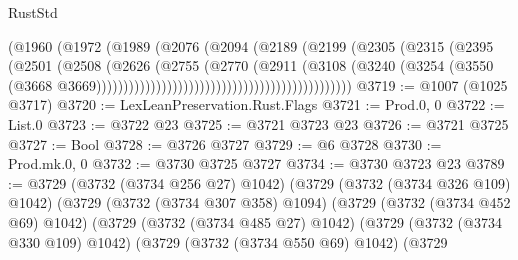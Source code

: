 \begin{lexlean}{RustStd}
\begin{coremodule}
                                                        (@1960
                                                          (@1972
                                                            (@1989
                                                              (@2076
                                                                (@2094
                                                                  (@2189
                                                                    (@2199
                                                                      (@2305
                                                                        (@2315
                                                                          (@2395
                                                                            (@2501
                                                                              (@2508
                                                                                (@2626
                                                                                  (@2755
                                                                                    (@2770
                                                                                      (@2911
                                                                                        (@3108
                                                                                          (@3240
                                                                                            (@3254
                                                                                              (@3550
                                                                                                (@3668
                                                                                                  @3669)))))))))))))))))))))))))))))))))))))))))))))))
@3719 := @1007 (@1025 @3717)
@3720 := LexLeanPreservation.Rust.Flags
@3721 := Prod.{0, 0}
@3722 := List.{0}
@3723 := @3722 @23
@3725 := @3721 @3723 @23
@3726 := @3721 @3725
@3727 := Bool
@3728 := @3726 @3727
@3729 := @6 @3728
@3730 := Prod.mk.{0, 0}
@3732 := @3730 @3725 @3727
@3734 := @3730 @3723 @23
@3789 := @3729
    (@3732 (@3734 @256 @27) @1042)
    (@3729
      (@3732 (@3734 @326 @109) @1042)
      (@3729
        (@3732 (@3734 @307 @358) @1094)
        (@3729
          (@3732 (@3734 @452 @69) @1042)
          (@3729
            (@3732 (@3734 @485 @27) @1042)
            (@3729
              (@3732 (@3734 @330 @109) @1042)
              (@3729
                (@3732 (@3734 @550 @69) @1042)
                (@3729

\end{coremodule}
\end{lexlean}
